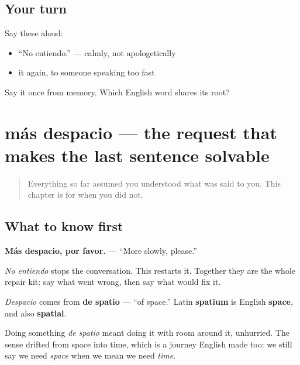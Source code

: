 \subsection*{Your turn}
Say these aloud:

\begin{itemize}
\raggedright
  \item \textquotedblleft{}No entiendo.\textquotedblright{} — calmly, not apologetically
  \item it again, to someone speaking too fast
\end{itemize}

\begin{tcolorbox}[breakable,colback=teal!4,colframe=teal!35!black,title={Before you move on}]
Say it once from memory. Which English word shares its root?
\end{tcolorbox}
\section[más despacio]{más despacio — the request that makes the last sentence solvable}

\label{lesson:ES-R02-mas-despacio}



\begin{quote}
Everything so far assumed you understood what was said to you. This chapter is for when you did not.
\end{quote}

\subsection*{What to know first}
\textbf{Más despacio, por favor.} — \textquotedblleft{}More slowly, please.\textquotedblright{}

\emph{No entiendo} stops the conversation. This restarts it. Together they are the whole repair kit: say what went wrong, then say what would fix it.

\begin{cousinweb}
\emph{Despacio} comes from \textbf{de spatio} — \textquotedblleft{}of space.\textquotedblright{} Latin \textbf{spatium} is English \textbf{space}, and also \textbf{spatial}.

Doing something \emph{de spatio} meant doing it with room around it, unhurried. The sense drifted from space into time, which is a journey English made too: we still say we need \emph{space} when we mean we need \emph{time}.
\end{cousinweb}

